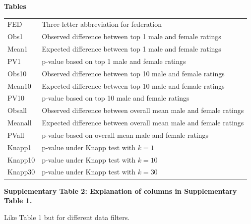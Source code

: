\documentclass[9pt,twocolumn,twoside,lineno]{pnas-new}
\begin{document}
\medskip
\textbf{Tables}

\medskip

\onecolumn


\begin{center}
\begin{tabular}{|l|l|}
\hline
 FED  &  Three-letter abbreviation for federation\\
Obs1  &  Observed difference between top 1 male and female ratings \\
Mean1  &  Expected difference between top 1 male and female ratings \\
PV1    &  p-value based on top 1 male and female ratings \\
Obs10  &  Observed difference between top 10 male and female ratings \\
Mean10  &  Expected difference between top 10 male and female ratings \\
PV10    &  p-value based on top 10 male and female ratings \\
Obsall  &  Observed difference between overall mean male and female ratings \\
Meanall  &  Expected difference between overall mean male and female ratings \\
PVall    &  p-value based on overall mean male and female ratings \\
Knapp1 & p-value under Knapp test with $k=1$\\
Knapp10 & p-value under Knapp test with $k=10$\\
Knapp30 & p-value under Knapp test with $k=30$\\
\hline
\end{tabular}
\end{center}
\vskip0.2in
\hskip0.5in
\textbf{\large Supplementary Table 2: Explanation of columns in Supplementary Table 1.}

\newpage

\begin{table}[t]
\caption{Like Table 1 but for different data filters.}
\end{table}
\end{document}
